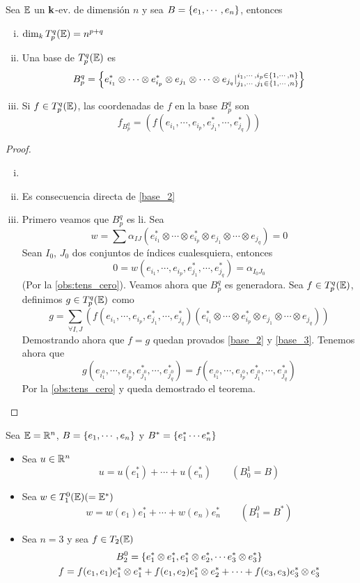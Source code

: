 \begin{thm}[(base de $T_p^q(\E)$)]
	Sea $\mathbb{E}$ un $\mathbf{k}$-ev. de dimensión $n$ y sea $B = \left\{e_1, \cdots, e_n\right\}$,
	entonces
\begin{enumerate}[i)]
		\item $\dim_k T_p^q(\mathbb{E}) = n^{p+q}$
		\item \label{base_2} Una base de $T_p^q(\E)$ es
		\[
			B_p^q = \left\{ e_{i_1}^* \otimes \cdots \otimes e_{i_p}^* \otimes
			e_{j_1} \otimes \cdots \otimes e_{j_q} \vert
			\substack{i_1, \cdots, i_p \in \left\{1,\cdots,n\right\} \\
				j_1, \cdots, j_1 \in \left\{1,\cdots,n\right\}} \right\}
		\]
		\item \label{base_3} Si $f \in T_p^q(\mathbb{E})$, las coordenadas de $f$ en la base $B_p^q$ son
		\[
			f_{B_p^q} = (f(e_{i_1}, \cdots, e_{i_p}, e_{j_1}^*, \cdots, e_{j_q}^*))
		\]
	\end{enumerate}
\end{thm}
\begin{proof}
	\begin{enumerate}[i)]
		\item[]
		\item Es consecuencia directa de \ref{base_2}
		\item Primero veamos que $B_p^q$ es li. Sea
		\[
			w = \sum \alpha_{IJ}(e_{i_1}^* \otimes \cdots \otimes e_{i_p}^*
			\otimes e_{j_1} \otimes \cdots \otimes e_{j_q}) = 0
		\]
		Sean $I_0$, $J_0$ dos conjuntos de índices cualesquiera, entonces
		\[
			0 = w(e_{i_1}, \cdots, e_{i_p}, e_{j_1}^*, \cdots, e_{j_q}^*)
			= \alpha_{I_0J_0}
		\]
		(Por la \ref{obs:tens_cero}). Veamos ahora que $B_p^q$
		es generadora. Sea $f \in T_p^q(\mathbb{E})$, definimos $g \in T_p^q(\mathbb{E})$ como
		\[
			g = \sum_{\forall I,J} (f(e_{i_1}, \cdots, e_{i_p}, e_{j_1}^*, \cdots,
			e_{j_q}^*)(e_{i_1}^* \otimes \cdots \otimes e_{i_p}^* \otimes e_{j_1}
			\otimes \cdots \otimes e_{j_q}))
		\]
		Demostrando ahora que $f=g$ quedan provados \ref{base_2} y \ref{base_3}.
		Tenemos ahora que
		\[
			g(e_{i_1^0}, \cdots, e_{i_p^0}, e_{j_1^0}^*, \cdots, e_{j_q^0}^*) =
			f(e_{i_1^0}, \cdots, e_{i_p^0}, e_{j_1^0}^*, \cdots, e_{j_q^0}^*)
		\]
		Por la \ref{obs:tens_cero} y queda demostrado el teorema.
	\end{enumerate}
\end{proof}
\begin{example}
	Sea $\mathbb{E} = \mathbb{R}^n$, $B = \left\{e_1, \cdots, e_n\right\}$ y
	$B^* = \left\{e_1^* \cdots e_n^*\right\}$
	\begin{itemize}
		\item Sea $u \in \mathbb{R}^n$
		\[
			u = u(e_1^*) + \cdots + u(e_n^*) \qquad (B_0^1 = B)
		\]
		\item Sea $w \in T_1^0(\mathbb{E}) (= \mathbb{E}^*)$
		\[
			w = w(e_1)e_1^* + \cdots + w(e_n)e_n^* \qquad (B_1^0 = B^*)
		\]
		\item Sea $n = 3$ y sea $f \in T_2(\mathbb{E})$
		\begin{gather*}
			B_2^0 = \left\{e_1^* \otimes e_1^*, e_1^* \otimes e_2^*,
			\cdots e_3^* \otimes e_3^*\right\} \\ f = f(e_1,e_1)e_1^*\otimes e_1^* +
			f(e_1,e_2)e_1^*\otimes e_2^* +\cdots + f(e_3,e_3)e_3^* \otimes e_3^*
		\end{gather*}
	\end{itemize}
\end{example}
